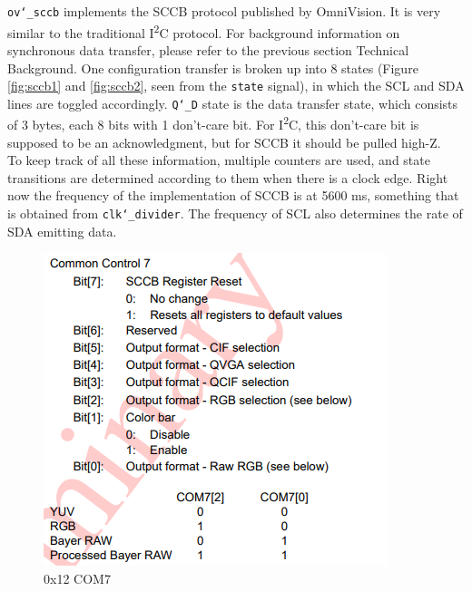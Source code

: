 \documentclass{article}
\begin{document}
	\texttt{ov\char`_sccb} implements the SCCB protocol \cite{sccbdatasheet} published by OmniVision. It is very similar to the traditional I\textsuperscript{2}C protocol. For background information on synchronous data transfer, please refer to the previous section Technical Background. One configuration transfer is broken up into 8 states (Figure \ref{fig:sccb1} and \ref{fig:sccb2}, seen from the \texttt{state} signal), in which the SCL and SDA lines are toggled accordingly. \texttt{Q\char`_D} state is the data transfer state, which consists of 3 bytes, each 8 bits with 1 don’t-care bit. For I\textsuperscript{2}C, this don’t-care bit is supposed to be an acknowledgment, but for SCCB it should be pulled high-Z.
	\\
	
	To keep track of all these information, multiple counters are used, and state transitions are determined according to them when there is a clock edge. Right now the frequency of the implementation of SCCB is at 5600 ms, something that is obtained from \texttt{clk\char`_divider}. The frequency of SCL also determines the rate of SDA emitting data.
	\begin{figure}[h]
		\centering
		\includegraphics[scale=0.9]{com72}
		\caption{0x12 COM7}
		\label{fig:com72}
	\end{figure}
	\\
	
\end{document}
